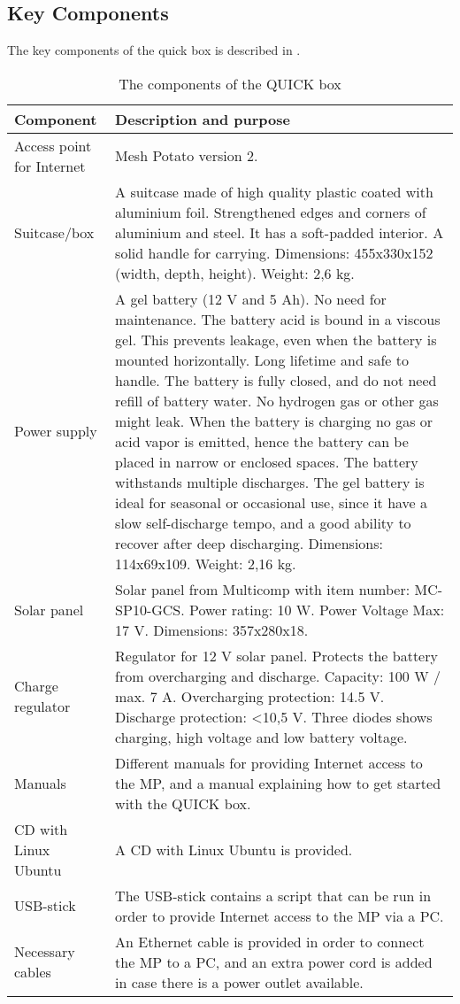 \subsection{Key Components}
The key components of the \gls{quick} box is described in . 

\begin{center}
\begin{table}[t]
\caption{\label{tab:components}The components of the QUICK box}
    \begin{tabular}{ | l | p{9cm} |}
    \hline
    \textbf{Component} & \textbf{Description and purpose} \\ 
    \hline
    Access point for Internet &  Mesh Potato version 2.\\ 
    \hline
    Suitcase/box &  A suitcase made of high quality plastic coated with aluminium foil. Strengthened edges and corners of aluminium and steel. It has a soft-padded interior. A solid handle for carrying. Dimensions: 455x330x152 (width, depth, height). Weight: 2,6 kg. \\ 
    \hline
    Power supply & A gel battery (12 V and 5 Ah). No need for maintenance. The battery acid is bound in a viscous gel. This prevents leakage, even when the battery is mounted horizontally. Long lifetime and safe to handle. The battery is fully closed, and do not need refill of battery water. No hydrogen gas or other gas might leak. When the battery is charging no gas or acid vapor is emitted, hence the battery can be placed in narrow or enclosed spaces. The battery withstands multiple discharges. The gel battery is ideal for seasonal or occasional use, since it have a slow self-discharge tempo, and a good ability to recover after deep discharging. Dimensions: 114x69x109. Weight: 2,16 kg. \\
    \hline
	Solar panel & Solar panel from Multicomp with item number: MC-SP10-GCS. Power rating: 10 W. Power Voltage Max: 17 V. Dimensions: 357x280x18.\\
	\hline
	Charge regulator & Regulator for 12 V solar panel. Protects the battery from overcharging and discharge. Capacity: 100 W / max. 7 A. Overcharging protection: 14.5 V. Discharge protection: <10,5 V. Three diodes shows charging, high voltage and low battery voltage. \\
	\hline
	Manuals & Different manuals for providing Internet access to the MP, and a manual explaining how to get started with the QUICK box.\\
	\hline
	CD with Linux Ubuntu & A CD with Linux Ubuntu is provided.\\
	\hline
	USB-stick & The USB-stick contains a script that can be run in order to provide Internet access to the MP via a PC.\\
	\hline
	Necessary cables & An Ethernet cable is provided in order to connect the MP to a PC, and an extra power cord is added in case there is a power outlet available. \\
	\hline
    \end{tabular}
   \end{table}
\end{center}

